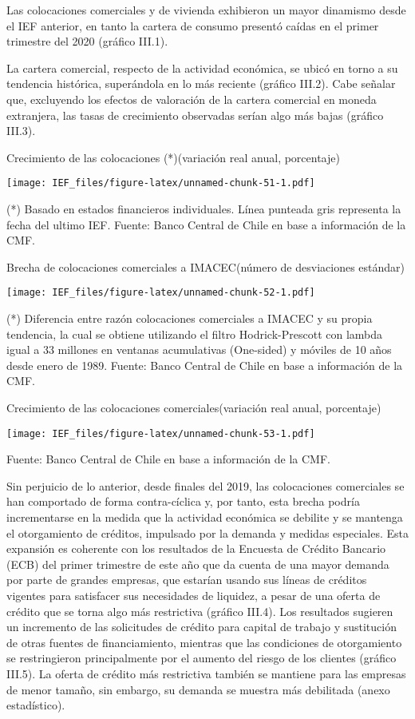 \documentclass[
]{book}
\begin{document}
Las colocaciones comerciales y de vivienda exhibieron un mayor
dinamismo desde el IEF anterior, en tanto la cartera de consumo
presentó caídas en el primer trimestre del 2020 (gráfico III.1).

La cartera comercial, respecto de la actividad económica, se ubicó en torno a su
tendencia histórica, superándola en lo más reciente (gráfico III.2). Cabe señalar que,
excluyendo los efectos de valoración de la cartera comercial en moneda extranjera,
las tasas de crecimiento observadas serían algo más bajas (gráfico III.3).

Crecimiento de las colocaciones (*)(variación real anual, porcentaje)

\texttt{[image: IEF\_files/figure-latex/unnamed-chunk-51-1.pdf]}

(*) Basado en estados financieros individuales. Línea punteada gris representa la fecha del ultimo IEF.
Fuente: Banco Central de Chile en base a información de la CMF.

Brecha de colocaciones comerciales a IMACEC(número de desviaciones estándar)

\texttt{[image: IEF\_files/figure-latex/unnamed-chunk-52-1.pdf]}

(*) Diferencia entre razón colocaciones comerciales a IMACEC y su propia tendencia, la cual se obtiene utilizando el filtro Hodrick-Prescott con lambda igual a 33 millones en ventanas acumulativas (One-sided) y móviles de 10 años desde enero de 1989.
Fuente: Banco Central de Chile en base a información de la CMF.

Crecimiento de las colocaciones comerciales(variación real anual, porcentaje)

\texttt{[image: IEF\_files/figure-latex/unnamed-chunk-53-1.pdf]}

Fuente: Banco Central de Chile en base a información de la CMF.

Sin perjuicio de lo anterior, desde finales del 2019, las colocaciones comerciales se han
comportado de forma contra-cíclica y, por tanto, esta brecha podría incrementarse
en la medida que la actividad económica se debilite y se mantenga el otorgamiento
de créditos, impulsado por la demanda y medidas especiales. Esta expansión es
coherente con los resultados de la Encuesta de Crédito Bancario (ECB) del primer
trimestre de este año que da cuenta de una mayor demanda por parte de grandes
empresas, que estarían usando sus líneas de créditos vigentes para satisfacer sus
necesidades de liquidez, a pesar de una oferta de crédito que se torna algo más
restrictiva (gráfico III.4). Los resultados sugieren un incremento de las solicitudes
de crédito para capital de trabajo y sustitución de otras fuentes de financiamiento,
mientras que las condiciones de otorgamiento se restringieron principalmente
por el aumento del riesgo de los clientes (gráfico III.5). La oferta de crédito más
restrictiva también se mantiene para las empresas de menor tamaño, sin embargo,
su demanda se muestra más debilitada (anexo estadístico).
\end{document}
